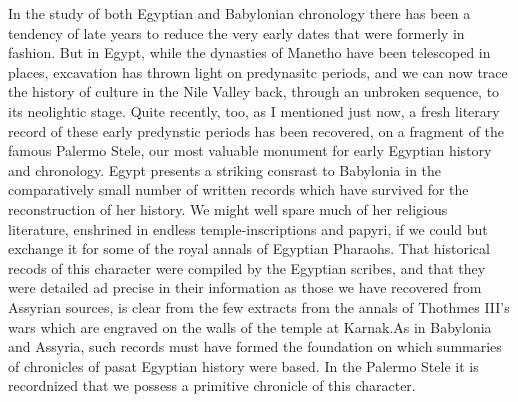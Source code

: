 \documentclass[12pt,oneside]{book}
\begin{document}
In the study of both Egyptian and Babylonian chronology there has been a tendency of late years to reduce the very early dates that were formerly in fashion. But in Egypt, while the dynasties of Manetho have been telescoped in places, excavation has thrown light on predynasitc periods, and we can now trace the history of culture in the Nile Valley back, through an unbroken sequence, to its neolightic stage. Quite recently, too, as I mentioned just now, a fresh literary record of these early predynstic periods has been recovered, on a fragment of the famous Palermo Stele, our most valuable monument for early Egyptian history and chronology. Egypt presents a striking consrast to Babylonia in the comparatively small number of written records which have survived for the reconstruction of her history. We might well spare much of her religious literature, enshrined in endless temple-inscriptions and papyri, if we could but exchange it for some of the royal annals of Egyptian Pharaohs. That historical recods of this character were compiled by the Egyptian scribes, and that they were detailed ad precise in their information as those we have recovered from Assyrian sources, is clear from the few extracts from the annals of Thothmes III's wars which are engraved on the walls of the temple at Karnak.\footnotemark As in Babylonia and Assyria, such records must have formed the foundation on which summaries of chronicles of pasat Egyptian history were based. In the Palermo Stele it is recordnized that we possess a primitive chronicle of this character. \par 

\end{document}
